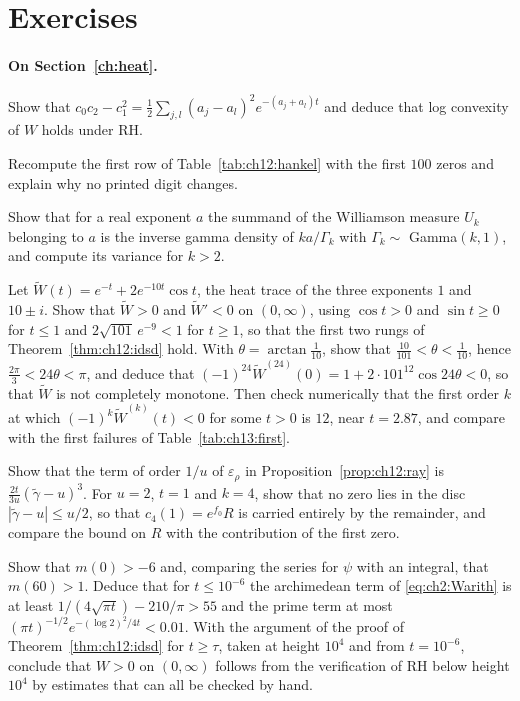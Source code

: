 \section{Exercises}\label{chap:heat:ex}

\paragraph{On Section~\ref{ch:heat}.}
\begin{exercises}
\item Show that $c_0c_2-c_1^2=\frac12\sum_{j,l}(a_j-a_l)^2e^{-(a_j+a_l)t}$ and deduce that log convexity of $W$ holds under RH.
\item Recompute the first row of Table~\ref{tab:ch12:hankel} with the first $100$ zeros and explain why no printed digit changes.
\item Show that for a real exponent $a$ the summand of the Williamson measure $U_k$ belonging to $a$ is the inverse gamma density of $ka/\Gamma_k$ with $\Gamma_k\sim$ Gamma$(k,1)$, and compute its variance for $k>2$.
\item\label{ex:ch12:toy} Let $\widetilde W(t)=e^{-t}+2e^{-10t}\cos t$, the heat trace of the three exponents $1$ and $10\pm i$. Show that $\widetilde W>0$ and $\widetilde W'<0$ on $(0,\infty)$, using $\cos t>0$ and $\sin t\ge0$ for $t\le1$ and $2\sqrt{101}\,e^{-9}<1$ for $t\ge1$, so that the first two rungs of Theorem~\ref{thm:ch12:idsd} hold. With $\theta=\arctan\frac1{10}$, show that $\frac{10}{101}<\theta<\frac1{10}$, hence $\frac{2\pi}3<24\theta<\pi$, and deduce that $(-1)^{24}\widetilde W^{(24)}(0)=1+2\cdot101^{12}\cos24\theta<0$, so that $\widetilde W$ is not completely monotone. Then check numerically that the first order $k$ at which $(-1)^k\widetilde W^{(k)}(t)<0$ for some $t>0$ is $12$, near $t=2.87$, and compare with the first failures of Table~\ref{tab:ch13:first}.
\item Show that the term of order $1/u$ of $\varepsilon_\rho$ in Proposition~\ref{prop:ch12:ray} is $\frac{2t}{3u}(\tilde\gamma-u)^3$. For $u=2$, $t=1$ and $k=4$, show that no zero lies in the disc $|\tilde\gamma-u|\le u/2$, so that $c_4(1)=e^{f_0}R$ is carried entirely by the remainder, and compare the bound on $R$ with the contribution of the first zero.
\item Show that $m(0)>-6$ and, comparing the series for $\psi$ with an integral, that $m(60)>1$. Deduce that for $t\le10^{-6}$ the archimedean term of \eqref{eq:ch2:Warith} is at least $1/(4\sqrt{\pi t})-210/\pi>55$ and the prime term at most $(\pi t)^{-1/2}e^{-(\log2)^2/4t}<0.01$. With the argument of the proof of Theorem~\ref{thm:ch12:idsd} for $t\ge\tau$, taken at height $10^4$ and from $t=10^{-6}$, conclude that $W>0$ on $(0,\infty)$ follows from the verification of RH below height $10^4$ by estimates that can all be checked by hand.
\end{exercises}

